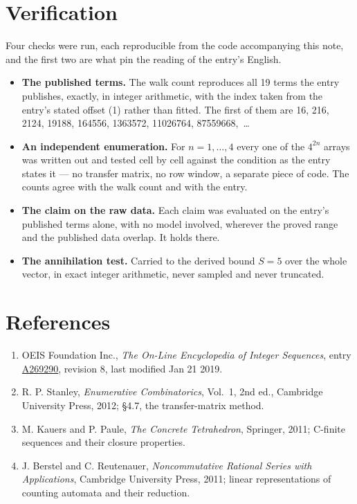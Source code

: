 \documentclass[11pt]{article}
\theoremstyle{definition}
\begin{document}
\section{Verification}

Four checks were run, each reproducible from the code accompanying this note, and the first two are what pin the reading of the entry's English.

\begin{itemize}

\item {\bfseries The published terms.} The walk count reproduces all 19 terms the entry publishes, exactly, in integer arithmetic, with the index taken from the entry's stated offset (1) rather than fitted. The first of them are 16, 216, 2124, 19188, 164556, 1363572, 11026764, 87559668,~\dots

\item {\bfseries An independent enumeration.} For $n = 1,\dots,4$ every one of the $4^{2n}$ arrays was written out and tested cell by cell against the condition as the entry states it --- no transfer matrix, no row window, a separate piece of code. The counts agree with the walk count and with the entry.

\item {\bfseries The claim on the raw data.} Each claim was evaluated on the entry's published terms alone, with no model involved, wherever the proved range and the published data overlap. It holds there.

\item {\bfseries The annihilation test.} Carried to the derived bound $S = 5$ over the whole vector, in exact integer arithmetic, never sampled and never truncated.

\end{itemize}

\section{References}

\begin{enumerate}

\item OEIS Foundation Inc., \emph{The On-Line Encyclopedia of Integer Sequences}, entry \href{https://oeis.org/A269290}{A269290}, revision 8, last modified Jan 21 2019.

\item R. P. Stanley, \emph{Enumerative Combinatorics}, Vol.~1, 2nd ed., Cambridge University Press, 2012; \S4.7, the transfer-matrix method.

\item M. Kauers and P. Paule, \emph{The Concrete Tetrahedron}, Springer, 2011; C-finite sequences and their closure properties.

\item J. Berstel and C. Reutenauer, \emph{Noncommutative Rational Series with Applications}, Cambridge University Press, 2011; linear representations of counting automata and their reduction.

\end{enumerate}
\end{document}

